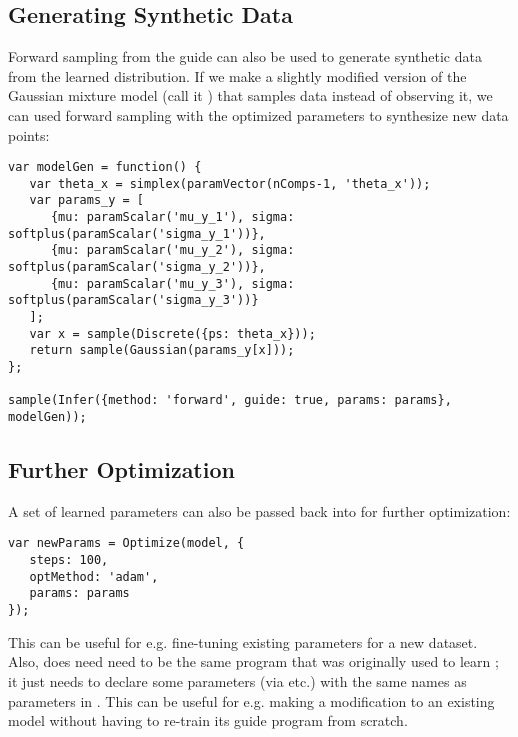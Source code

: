 \subsection{Generating Synthetic Data}

Forward sampling from the guide can also be used to generate synthetic data from the learned distribution. If we make a slightly modified version of the Gaussian mixture model (call it ) that samples data instead of observing it, we can used forward sampling with the optimized parameters  to synthesize new data points:
\begin{lstlisting}
var modelGen = function() {
   var theta_x = simplex(paramVector(nComps-1, 'theta_x'));
   var params_y = [
      {mu: paramScalar('mu_y_1'), sigma: softplus(paramScalar('sigma_y_1'))},
      {mu: paramScalar('mu_y_2'), sigma: softplus(paramScalar('sigma_y_2'))},
      {mu: paramScalar('mu_y_3'), sigma: softplus(paramScalar('sigma_y_3'))}
   ];
   var x = sample(Discrete({ps: theta_x}));
   return sample(Gaussian(params_y[x]));
};

sample(Infer({method: 'forward', guide: true, params: params}, modelGen));
\end{lstlisting}

\subsection{Further Optimization}

A set of learned parameters  can also be passed back into  for further optimization:
\begin{lstlisting}
var newParams = Optimize(model, {
   steps: 100,
   optMethod: 'adam',
   params: params
});
\end{lstlisting}
This can be useful for e.g. fine-tuning existing parameters for a new dataset. Also,  does need need to be the same program that was originally used to learn ; it just needs to declare some parameters (via  etc.) with the same names as parameters in . This can be useful for e.g. making a modification to an existing model without having to re-train its guide program from scratch.
